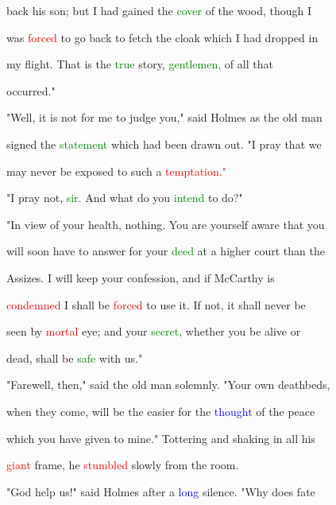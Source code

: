  back his son; but I had \textcolor{BurntOrange}{gained} the \textcolor{green}{cover} of the wood, though I

 was \textcolor{red}{forced} to go back to fetch the cloak which I had dropped in

 my flight. That is the \textcolor{green}{true} story, \textcolor{green}{gentlemen,} of all that

 occurred."



 "Well, it is not for me to judge you," said Holmes as the old man

 signed the \textcolor{green}{statement} which had been drawn out. "I \textcolor{BurntOrange}{pray} that we

 may never be \textcolor{BurntOrange}{exposed} to such a \textcolor{red}{temptation."}



 "I \textcolor{BurntOrange}{pray} not, \textcolor{green}{sir.} And what do you \textcolor{green}{intend} to do?"



 "In view of your health, nothing. You are yourself aware that you

 will soon have to answer for your \textcolor{green}{deed} at a higher \textcolor{BurntOrange}{court} than the

 Assizes. I will keep your \textcolor{BurntOrange}{confession,} and if McCarthy is

 \textcolor{red}{condemned} I shall be \textcolor{red}{forced} to use it. If not, it shall never be

 seen by \textcolor{red}{mortal} eye; and your \textcolor{green}{secret,} whether you be \textcolor{BurntOrange}{alive} or

 dead, shall be \textcolor{green}{safe} with us."



 "Farewell, then," said the old man solemnly. "Your own deathbeds,

 when they come, will be the easier for the \textcolor{blue}{thought} of the \textcolor{BurntOrange}{peace}

 which you have given to mine." Tottering and shaking in all his

 \textcolor{red}{giant} frame, he \textcolor{red}{stumbled} slowly from the room.



 \textcolor{BurntOrange}{"God} help us!" said Holmes after a \textcolor{blue}{long} silence. "Why does \textcolor{BurntOrange}{fate}

